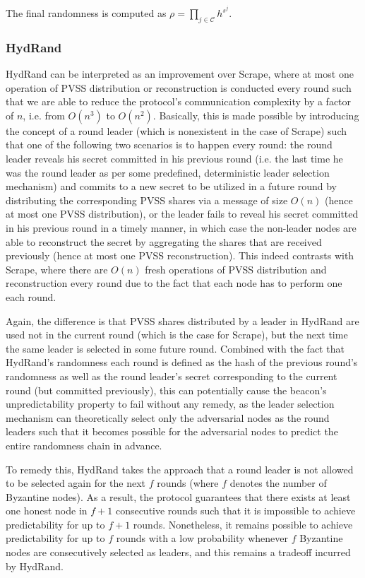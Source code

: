\documentclass[11pt]{article}
\theoremstyle{definition}
\theoremstyle{remark}
\begin{document}
The final randomness is computed as $\rho = \prod_{j \in \mathcal{C}} h^{s^j}$.

\subsubsection{HydRand}
HydRand can be interpreted as an improvement over Scrape, where at most one operation of PVSS distribution or reconstruction is conducted every round such that we are able to reduce the protocol's communication complexity by a factor of $n$, i.e. from $O(n^3)$ to $O(n^2)$. Basically, this is made possible by introducing the concept of a round leader (which is nonexistent in the case of Scrape) such that one of the following two scenarios is to happen every round: the round leader reveals his secret committed in his previous round (i.e. the last time he was the round leader as per some predefined, deterministic leader selection mechanism) and commits to a new secret to be utilized in a future round by distributing the corresponding PVSS shares via a message of size $O(n)$ (hence at most one PVSS distribution), or the leader fails to reveal his secret committed in his previous round in a timely manner, in which case the non-leader nodes are able to reconstruct the secret by aggregating the shares that are received previously (hence at most one PVSS reconstruction). This indeed contrasts with Scrape, where there are $O(n)$ fresh operations of PVSS distribution and reconstruction every round due to the fact that each node has to perform one each round.

Again, the difference is that PVSS shares distributed by a leader in HydRand are used not in the current round (which is the case for Scrape), but the next time the same leader is selected in some future round. Combined with the fact that HydRand's randomness each round is defined as the hash of the previous round's randomness as well as the round leader's secret corresponding to the current round (but committed previously), this can potentially cause the beacon's unpredictability property to fail without any remedy, as the leader selection mechanism can theoretically select only the adversarial nodes as the round leaders such that it becomes possible for the adversarial nodes to predict the entire randomness chain in advance.

To remedy this, HydRand takes the approach that a round leader is not allowed to be selected again for the next $f$ rounds (where $f$ denotes the number of Byzantine nodes). As a result, the protocol guarantees that there exists at least one honest node in $f + 1$ consecutive rounds such that it is impossible to achieve predictability for up to $f + 1$ rounds. Nonetheless, it remains possible to achieve predictability for up to $f$ rounds with a low probability whenever $f$ Byzantine nodes are consecutively selected as leaders, and this remains a tradeoff incurred by HydRand.
\end{document}
